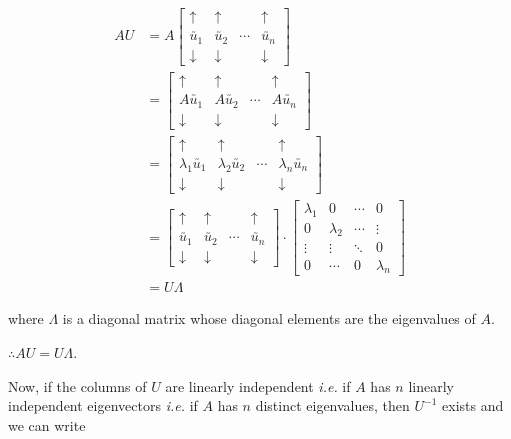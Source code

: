 \documentclass[11pt, a4paper]{article}
\begin{document}
\begin{align*}
AU &= A \begin{bmatrix}
\uparrow & \uparrow & & \uparrow \\
\utilde{u_1} & \utilde{u_2} & \cdots & \utilde{u_n} \\
\downarrow & \downarrow & & \downarrow
\end{bmatrix} \\[1.5em]
&= \begin{bmatrix}
\uparrow & \uparrow & & \uparrow \\
A\utilde{u_1} & A\utilde{u_2} & \cdots & A\utilde{u_n} \\
\downarrow & \downarrow & & \downarrow
\end{bmatrix} \\[1.5em]
&= \begin{bmatrix}
\uparrow & \uparrow & & \uparrow \\
\lambda_1 \utilde{u_1} & \lambda_2 \utilde{u_2} & \cdots & \lambda_n \utilde{u_n} \\
\downarrow & \downarrow & & \downarrow
\end{bmatrix} \\[1.5em]
&= \begin{bmatrix}
\uparrow & \uparrow & & \uparrow \\
\utilde{u_1} & \utilde{u_2} & \cdots & \utilde{u_n} \\
\downarrow & \downarrow & & \downarrow
\end{bmatrix} \cdot
\begin{bmatrix}
\lambda_1 & 0 & \cdots & 0 \\
0 & \lambda_2 & \cdots & \vdots \\
\vdots & \vdots & \ddots & 0 \\
0 & \cdots & 0 & \lambda_n
\end{bmatrix} \\[1.5em]
&= U \Lambda
\end{align*}

where $\Lambda$ is a diagonal matrix whose diagonal elements are the eigenvalues of $A$. \\

\vspace{0.3cm}

$\therefore AU = U\Lambda$. \\

\vspace{0.3cm}

Now, if the columns of $U$ are linearly independent \textit{i.e.} if $A$ has $n$ linearly independent eigenvectors \textit{i.e.} if $A$ has $n$ distinct eigenvalues, then $U^{-1}$ exists and we can write
\end{document}
